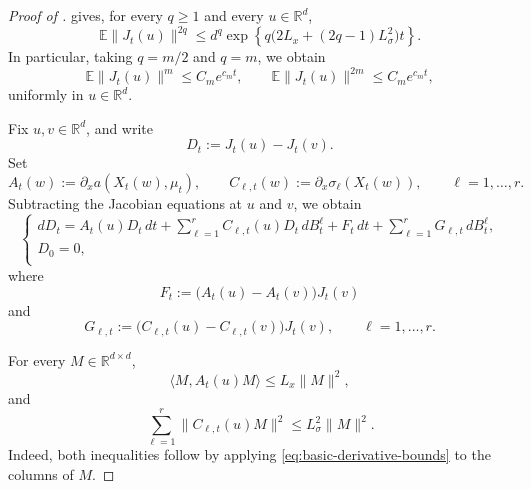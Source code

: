 \documentclass{tsp-short}
\theoremstyle{remark}
\theoremstyle{definition}
\newcommand{\R}{\mathbb{R}} %
\newcommand{\E}{\mathbb E} %
\begin{document}
\begin{proof}[Proof of ]
	 gives, for every \(q\ge1\) and every \(u\in\R^d\),
	\begin{equation*}
		\E\|J_t(u)\|^{2q} \le d^q\exp\left\{ q\bigl(2L_x+(2q-1)L_\sigma^2\bigr)t \right\}.
	\end{equation*}
	In particular, taking \(q=m/2\) and \(q=m\), we obtain
	\begin{equation}\label{eq:jacobian-moment}
		\E\|J_t(u)\|^m \le C_m e^{c_m t}, \qquad \E\|J_t(u)\|^{2m} \le C_m e^{c_m t},
	\end{equation}
	uniformly in \(u\in\R^d\).

	Fix \(u,v\in\R^d\), and write
	\begin{equation*}
		D_t:=J_t(u)-J_t(v).
	\end{equation*}
	Set
	\begin{equation*}
		A_t(w):=\partial_x a(X_t(w),\mu_t), \qquad C_{\ell,t}(w):=\partial_x\sigma_\ell(X_t(w)), \qquad \ell=1,\dots,r.
	\end{equation*}
	Subtracting the Jacobian equations at \(u\) and \(v\), we obtain
	\begin{equation}\label{eq:jacobian-difference-sde}
		\begin{cases}
			dD_t = A_t(u)D_t\,dt + \sum_{\ell=1}^{r}C_{\ell,t}(u)D_t\,dB_t^\ell + F_t\,dt +
			\sum_{\ell=1}^{r}G_{\ell,t}\,dB_t^\ell, \\[1mm]
			D_0=0,                                  \\[1mm]
		\end{cases}
	\end{equation}
	where
	\begin{equation*}
		F_t := \bigl(A_t(u)-A_t(v)\bigr)J_t(v)
	\end{equation*}
	and
	\begin{equation*}
		G_{\ell,t} := \bigl(C_{\ell,t}(u)-C_{\ell,t}(v)\bigr)J_t(v), \qquad \ell=1,\dots,r.
	\end{equation*}

	For every \(M\in\R^{d\times d}\),
	\begin{equation*}
		\langle M,A_t(u)M\rangle \le L_x\|M\|^2,
	\end{equation*}
	and
	\begin{equation*}
		\sum_{\ell=1}^{r} \|C_{\ell,t}(u)M\|^2 \le L_\sigma^2\|M\|^2.
	\end{equation*}
	Indeed, both inequalities follow by applying \eqref{eq:basic-derivative-bounds} to the columns of \(M\).


\end{proof}
\end{document}
